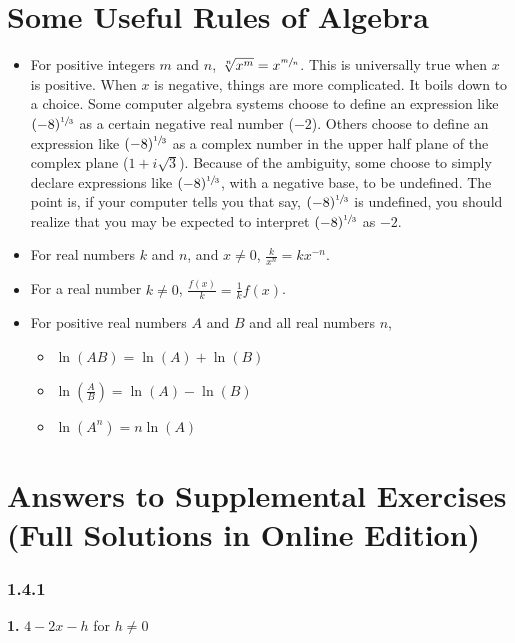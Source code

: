 \documentclass[12pt,]{book}
\theoremstyle{plain}
\theoremstyle{definition}
\numberwithin{equation}{section}
\newcommand{\fe}[2]{#1\mathopen{}\left(#2\right)\mathclose{}}
\begin{document}
\chapter[Some Useful Rules of Algebra]{Some Useful Rules of Algebra}\label{appendix-useful-algebra}
\begin{itemize}[label=\textbullet]
\item{}For positive integers \(m\) and \(n\), \(\sqrt[n]{x^m}=x^{\sfrac{m}{n}}\). This is universally true when \(x\) is positive. When \(x\) is negative, things are more complicated. It boils down to a choice. Some computer algebra systems choose to define an expression like \((-8)^{\sfrac{1}{3}}\) as a certain negative real number (\(-2\)). Others choose to define an expression like \((-8)^{\sfrac{1}{3}}\) as a complex number in the upper half plane of the complex plane (\(1+i\sqrt{3}\)). Because of the ambiguity, some choose to simply declare expressions like \((-8)^{\sfrac{1}{3}}\), with a negative base, to be undefined. The point is, if your computer tells you that say, \((-8)^{\sfrac{1}{3}}\) is undefined, you should realize that you may be expected to interpret \((-8)^{\sfrac{1}{3}}\) as \(-2\).\item{}For real numbers \(k\) and \(n\), and \(x\neq0\), \(\frac{k}{x^n}=kx^{-n}\).\item{}For a real number \(k\neq0\), \(\frac{\fe{f}{x}}{k}=\frac{1}{k}\fe{f}{x}\).\item{}For positive real numbers \(A\) and \(B\) and all real numbers \(n\), 
            \begin{itemize}[label=$\circ$]
\item{}\(\fe{\ln}{AB}=\fe{\ln}{A}+\fe{\ln}{B}\)\item{}\(\fe{\ln}{\frac{A}{B}}=\fe{\ln}{A}-\fe{\ln}{B}\)\item{}\(\fe{\ln}{A^n}=n\fe{\ln}{A}\)\end{itemize}

        \end{itemize}
%
\backmatter
%
\typeout{************************************************}
\typeout{************************************************}
\chapter[Answers to Supplemental Exercises]{Answers to Supplemental Exercises (Full Solutions in Online Edition)}\label{supplemental-solutions}
\subsection*{1.4.1 }
\noindent\textbf{1.}\quad{}
                    \(4-2x-h\) for \(h\neq0\)%
\end{document}

